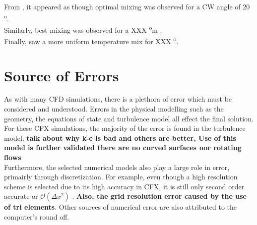 From \cite{mobin}, it appeared as though optimal mixing was observed for a CW angle of 20 \textsuperscript{o}.\\


Similarly, best mixing was observed for a XXX \textsuperscript{o}m \cite{curtis}.\\

Finally, \cite{tolu} saw a more uniform temperature mix for XXX \textsuperscript{o}.
 
\section{Source of Errors}
\label{sec:err}

As with many CFD simulations, there is a plethora of error which must be considered and understood. Errors in the physical modelling such as the geometry, the equations of state and turbulence model all effect the final solution. For these CFX simulations, the majority of the error is found in the turbulence model. \textbf{talk about why k-e is bad and others are better, Use of this model is further validated there are no curved surfaces nor rotating flows }\\

%
%

Furthermore, the selected numerical models also play a large role in error, primairly through discretization. For example, even though a high resolution scheme is selected due to its high accuracy in CFX, it is still only second order accurate or $\mathcal{O} (\Delta x^2)$ \cite{cfdbook}. \textbf{Also, the grid resolution error caused by the use of tri elements}. Other sources of numerical error are also attributed to the computer's round off.


